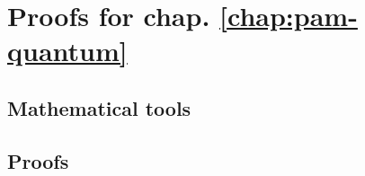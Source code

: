 \chapter{Proofs for chap. \ref{chap:pam-quantum}}
\label{ap:pam-quantum}

\section{Mathematical tools}
\section{Proofs}
